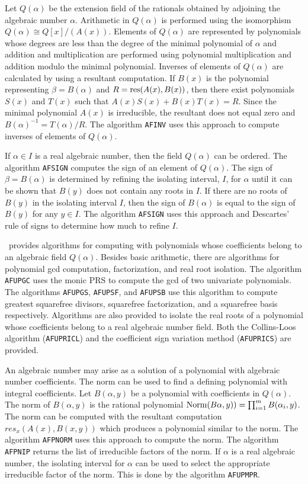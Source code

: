 Let $Q(\alpha)$ be the extension field of the rationals obtained by adjoining
the algebraic number $\alpha$.  Arithmetic in $Q(\alpha)$ is performed 
using the isomorphism $Q(\alpha) \cong Q[x]/(A(x))$.  Elements of $Q(\alpha)$
are represented by polynomials whose degrees are less than the degree of the
minimal polynomial of
$\alpha$ and  addition and multiplication
are performed using polynomial multiplication and addition
modulo the minimal polynomial.  Inverses of elements of $Q(\alpha)$ are
calculated by using a resultant computation.  If $B(x)$ is the polynomial
representing $\beta = B(\alpha)$ and $R = {\rm res}(A(x),B(x))$,
then there exist polynomials $S(x)$ and $T(x)$ such that
$A(x)S(x) + B(x)T(x) = R$.  Since the minimal polynomial $A(x)$ is irreducible,
the resultant does not equal zero and $B(\alpha)^{-1} = T(\alpha)/R$.
The algorithm {\tt AFINV} uses this approach to compute inverses of elements
of $Q(\alpha)$.

If $\alpha \in I$ is a real algebraic number, then the field $Q(\alpha)$
can be ordered.  The algorithm {\tt AFSIGN} computes the sign of
an element of $Q(\alpha)$.  
The sign of $\beta = B(\alpha)$ is determined by refining the isolating
interval, $I$, for $\alpha$ until it can be shown that $B(y)$ does not
contain any roots in $I$.  If there are no roots of $B(y)$ in the isolating
interval $I$, then the sign of $B(\alpha)$ is equal to the sign of $B(y)$ for
any $y \in I$.  The algorithm {\tt AFSIGN} uses this approach
and Descartes' rule of signs to determine how much to refine $I$.

\saclib\ provides algorithms for computing with polynomials whose
coefficients belong to an algebraic field $Q(\alpha)$.  Besides basic
arithmetic, there are algorithms for polynomial gcd computation,
factorization, and real root isolation.  The algorithm
{\tt AFUPGC} uses the monic PRS to compute the gcd of two univariate
polynomials.
The algorithms {\tt AFUPGS}, {\tt AFUPSF}, and {\tt AFUPSB}
use this algorithm to compute greatest squarefree divisors, squarefree
factorization, and a squarefree basis respectively.  Algorithms are also
provided to isolate the real roots of a polynomial whose coefficients
belong to a real algebraic number field.  Both the Collins-Loos algorithm
({\tt AFUPRICL})
and the coefficient sign variation method ({\tt AFUPRICS}) are provided.

An algebraic number may arise as a solution of a polynomial with
algebraic number coefficients.  The norm can be used to find a defining
polynomial with integral coefficients.  Let $B(\alpha,y)$ be a polynomial
with coefficients in $Q(\alpha)$.  The norm of $B(\alpha,y)$ is the rational
polynomial ${\rm Norm}(B\alpha,y)) = \prod_{i=1}^m B(\alpha_i,y)$.  
The norm can be computed
with the resultant computation $res_x(A(x),B(x,y))$ which produces a
polynomial similar to the norm.  The algorithm
{\tt AFPNORM} uses this approach to compute the norm.  The algorithm
{\tt AFPNIP} returns the list of irreducible factors of the norm.
If $\alpha$ is
a real algebraic number, the isolating interval for $\alpha$ can be used
to select the appropriate irreducible factor of the norm.  This is done
by the algorithm {\tt AFUPMPR}.

